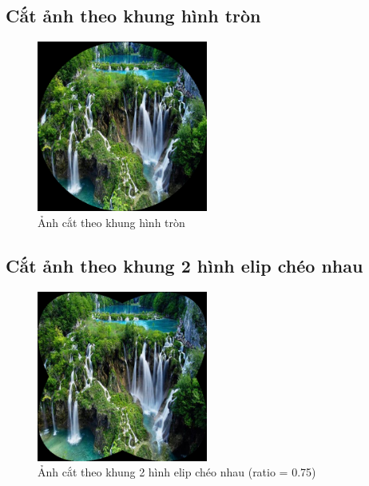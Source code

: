 \subsection{Cắt ảnh theo khung hình tròn}
\begin{figure}[H]
	\centering
	\includegraphics[width=0.5\textwidth]{images/res/512_crop_circle.png}
	\caption{Ảnh cắt theo khung hình tròn}
	\label{fig:crop_circle}
\end{figure}

\subsection{Cắt ảnh theo khung 2 hình elip chéo nhau}
\begin{figure}[H]
	\centering
	\includegraphics[width=0.5\textwidth]{images/res/512_crop_ellipse.png}
	\caption{Ảnh cắt theo khung 2 hình elip chéo nhau (ratio = 0.75)}
	\label{fig:crop_ellipse}
\end{figure}


